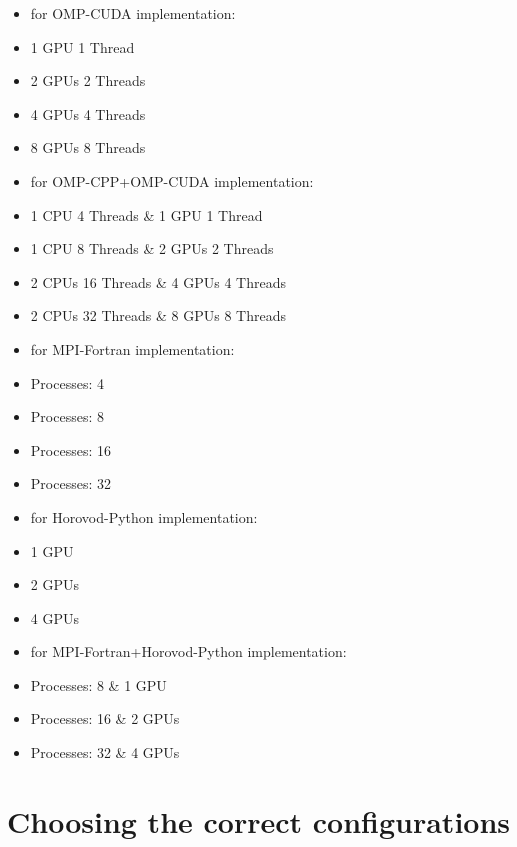 \begin{itemize}
\begin{itemize}
            \item for OMP-CUDA implementation:
            \item 1 GPU 1 Thread
            \item 2 GPUs 2 Threads
            \item 4 GPUs 4 Threads
            \item 8 GPUs 8 Threads
        \end{itemize}
        \begin{itemize}
            \item for OMP-CPP+OMP-CUDA implementation:
            \item 1 CPU 4 Threads \& 1 GPU 1 Thread
            \item 1 CPU 8 Threads \& 2 GPUs 2 Threads
            \item 2 CPUs 16 Threads \& 4 GPUs 4 Threads
            \item 2 CPUs 32 Threads \& 8 GPUs 8 Threads
        \end{itemize}
        \begin{itemize}
            \item for MPI-Fortran implementation:
            \item Processes: 4
            \item Processes: 8
            \item Processes: 16
            \item Processes: 32
        \end{itemize}
        \begin{itemize}
            \item for Horovod-Python implementation:
            \item 1 GPU
            \item 2 GPUs
            \item 4 GPUs
        \end{itemize}
        \begin{itemize}
            \item for MPI-Fortran+Horovod-Python implementation:
            \item Processes: 8 \& 1 GPU
            \item Processes: 16 \& 2 GPUs
            \item Processes: 32 \& 4 GPUs
        \end{itemize}
\end{itemize}

\section{Choosing the correct configurations}


